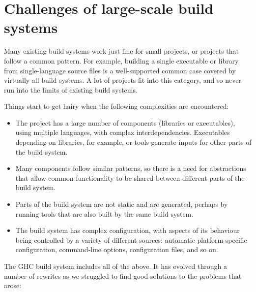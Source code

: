\section{Challenges of large-scale build systems\label{sec:challenges}}

Many existing build systems work just fine for small projects, or
projects that follow a common pattern.  For example, building a single
executable or library from single-language source files is a
well-supported common case covered by virtually all build systems.  A
lot of projects fit into this category, and so never run into the
limits of existing build systems.

Things start to get hairy when the following complexities are
encountered:

\begin{itemize}
\item The project has a large number of components (libraries or
  executables), using multiple languages, with complex
  interdependencies.  Executables depending on libraries, for example,
  or tools generate inputs for other parts of the build system.
\item Many components follow similar patterns, so there is a need for
  abstractions that allow common functionality to be shared between
  different parts of the build system.
\item Parts of the build system are not static and are generated,
  perhaps by running tools that are also built by the same build
  system.
\item The build system has complex configuration, with aspects of its
  behaviour being controlled by a variety of different sources:
  automatic platform-specific configuration, command-line options,
  configuration files, and so on.
\end{itemize}

The GHC build system includes all of the above.  It has evolved
through a number of rewrites as we struggled to find good solutions to
the problems that arose:


